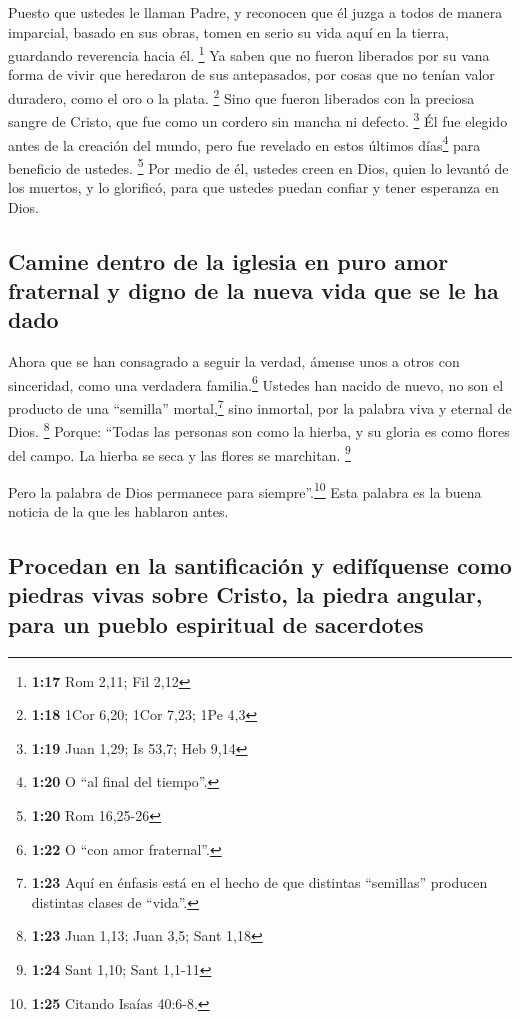  Puesto que ustedes le llaman Padre, y reconocen que él
juzga a todos de manera imparcial, basado en sus obras, tomen en serio
su vida aquí en la tierra, guardando reverencia hacia él. \footnote{\textbf{1:17}
  Rom 2,11; Fil 2,12}  Ya saben que no fueron liberados
por su vana forma de vivir que heredaron de sus antepasados, por cosas
que no tenían valor duradero, como el oro o la plata. \footnote{\textbf{1:18}
  1Cor 6,20; 1Cor 7,23; 1Pe 4,3}  Sino que fueron
liberados con la preciosa sangre de Cristo, que fue como un cordero sin
mancha ni defecto. \footnote{\textbf{1:19} Juan 1,29; Is 53,7; Heb 9,14}
 Él fue elegido antes de la creación del mundo, pero fue
revelado en estos últimos días\footnote{\textbf{1:20} O ``al final del
  tiempo''.} para beneficio de ustedes. \footnote{\textbf{1:20} Rom
  16,25-26}  Por medio de él, ustedes creen en Dios,
quien lo levantó de los muertos, y lo glorificó, para que ustedes puedan
confiar y tener esperanza en Dios.

\hypertarget{camine-dentro-de-la-iglesia-en-puro-amor-fraternal-y-digno-de-la-nueva-vida-que-se-le-ha-dado}{%
\subsection{Camine dentro de la iglesia en puro amor fraternal y digno
de la nueva vida que se le ha
dado}\label{camine-dentro-de-la-iglesia-en-puro-amor-fraternal-y-digno-de-la-nueva-vida-que-se-le-ha-dado}}

 Ahora que se han consagrado a seguir la verdad, ámense
unos a otros con sinceridad, como una verdadera familia.\footnote{\textbf{1:22}
  O ``con amor fraternal''.}  Ustedes han nacido de
nuevo, no son el producto de una ``semilla'' mortal,\footnote{\textbf{1:23}
  Aquí en énfasis está en el hecho de que distintas ``semillas''
  producen distintas clases de ``vida''.} sino inmortal, por la palabra
viva y eternal de Dios. \footnote{\textbf{1:23} Juan 1,13; Juan 3,5;
  Sant 1,18}  Porque: ``Todas las personas son como la
hierba, y su gloria es como flores del campo. La hierba se seca y las
flores se marchitan. \footnote{\textbf{1:24} Sant 1,10; Sant 1,1-11}

 Pero la palabra de Dios permanece para
siempre''.\footnote{\textbf{1:25} Citando Isaías 40:6-8.} Esta palabra
es la buena noticia de la que les hablaron antes.

\hypertarget{procedan-en-la-santificaciuxf3n-y-edifuxedquense-como-piedras-vivas-sobre-cristo-la-piedra-angular-para-un-pueblo-espiritual-de-sacerdotes}{%
\subsection{Procedan en la santificación y edifíquense como piedras
vivas sobre Cristo, la piedra angular, para un pueblo espiritual de
sacerdotes}\label{procedan-en-la-santificaciuxf3n-y-edifuxedquense-como-piedras-vivas-sobre-cristo-la-piedra-angular-para-un-pueblo-espiritual-de-sacerdotes}}

